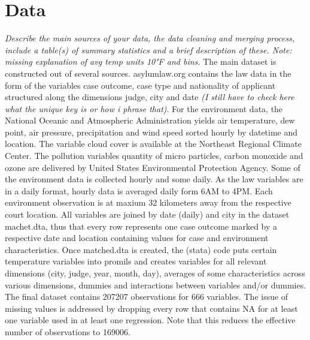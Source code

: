 \documentclass[11pt]{article}
\begin{document}
\section{Data}
\textit{Describe the main sources of your data, the data cleaning and merging process, include a table(s) of summary statistics and a brief description of these. Note: missing explanation of avg temp units 10°F and bins.}
\newline
The main dataset is constructed out of several sources. asylumlaw.org contains the law data in the form of the variables case outcome, case type and nationality of applicant structured along the dimensions judge, city and date \textit{(I still have to check here what the unique key is or how i phrase that)}. For the environment data, the National Oceanic and Atmospheric Administration yields air temperature, dew point, air pressure, precipitation and wind speed sorted hourly by datetime and location. The variable cloud cover is available at the Northeast Regional Climate Center. The pollution variables quantity of micro particles, carbon monoxide and ozone are delivered by United States Environmental Protection Agency. Some of the environment data is collected hourly and some daily. As the law variables are in a daily format, hourly data is averaged daily form 6AM to 4PM. Each environment observation is at maxium 32 kilometers away from the respective court location.
All variables are joined by date (daily) and city in the dataset machet.dta, thus that every row represents one case outcome marked by a respective date and location containing values for case and environment characteristics. \newline
Once matched.dta is created, the (stata) code puts certain temperature variables into promils and creates variables for all relevant dimensions (city, judge, year, month, day), averages of some characteristics across various dimensions, dummies and interactions between variables and/or dummies. The final dataset contains 207207 observations for 666 variables. The issue of missing values is addressed by dropping every row that contains NA for at least one variable used in at least one regression. Note that this reduces the effective number of observations to 169006.
\newline	
\end{document}

